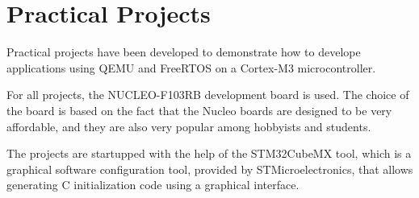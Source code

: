 \section{Practical Projects}
Practical projects have been developed to demonstrate how to develope applications using QEMU and FreeRTOS on a Cortex-M3 microcontroller.

For all projects, the NUCLEO-F103RB development board is used. The choice of the board is based on the fact that the Nucleo boards are designed to be very affordable, and they are also very popular among hobbyists and students.

The projects are startupped with the help of the STM32CubeMX tool, which is a graphical software configuration tool, provided by STMicroelectronics, that allows generating C initialization code using a graphical interface.





